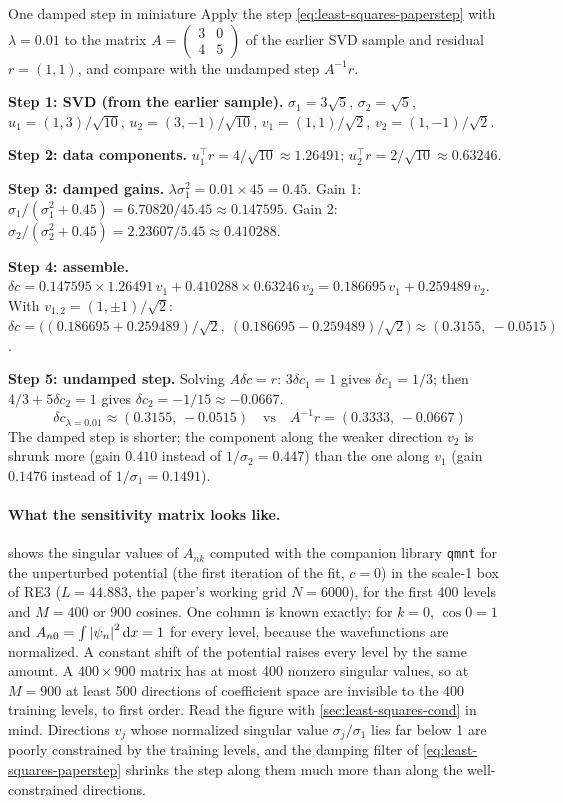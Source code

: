 \begin{sample}{One damped step in miniature}
Apply the step \cref{eq:least-squares-paperstep} with $\lambda = 0.01$ to the matrix $A = \begin{pmatrix}3&0\\4&5\end{pmatrix}$ of the earlier SVD sample and residual $r = (1,1)$, and compare with the undamped step $A^{-1}r$.

\textbf{Step 1: SVD (from the earlier sample).} $\sigma_1 = 3\sqrt5$, $\sigma_2 = \sqrt5$, $u_1 = (1,3)/\sqrt{10}$, $u_2 = (3,-1)/\sqrt{10}$, $v_1 = (1,1)/\sqrt2$, $v_2 = (1,-1)/\sqrt2$.

\textbf{Step 2: data components.} $u_1^\top r = 4/\sqrt{10}\approx1.26491$; $u_2^\top r = 2/\sqrt{10}\approx0.63246$.

\textbf{Step 3: damped gains.} $\lambda\sigma_1^2 = 0.01\times45 = 0.45$. Gain 1: $\sigma_1/(\sigma_1^2+0.45) = 6.70820/45.45\approx0.147595$. Gain 2: $\sigma_2/(\sigma_2^2+0.45) = 2.23607/5.45\approx0.410288$.

\textbf{Step 4: assemble.} $\delta c = 0.147595\times1.26491\,v_1 + 0.410288\times0.63246\,v_2 = 0.186695\,v_1 + 0.259489\,v_2$. With $v_{1,2} = (1,\pm1)/\sqrt2$: $\delta c = \bigl((0.186695+0.259489)/\sqrt2,\ (0.186695-0.259489)/\sqrt2\bigr)\approx(0.3155,\ -0.0515)$.

\textbf{Step 5: undamped step.} Solving $A\delta c = r$: $3\delta c_1 = 1$ gives $\delta c_1 = 1/3$; then $4/3 + 5\delta c_2 = 1$ gives $\delta c_2 = -1/15\approx-0.0667$.
\[
\boxed{\,\delta c_{\lambda=0.01}\approx(0.3155,\,-0.0515)\quad\text{vs}\quad A^{-1}r = (0.3333,\,-0.0667)\,}
\]
The damped step is shorter; the component along the weaker direction $v_2$ is shrunk more (gain $0.410$ instead of $1/\sigma_2 = 0.447$) than the one along $v_1$ (gain $0.1476$ instead of $1/\sigma_1 = 0.1491$).
\end{sample}

\paragraph{What the sensitivity matrix looks like.}  shows the singular values of $A_{nk}$ computed with the companion library \texttt{qmnt} for the unperturbed potential (the first iteration of the fit, $c=0$) in the scale-1 box of RE3 ($L = 44.883$, the paper's working grid $N=6000$), for the first 400 levels and $M = 400$ or $900$ cosines. One column is known exactly: for $k=0$, $\cos0 = 1$ and $A_{n0} = \int\left\lvert \psi_n\right\rvert^2\mathrm{d} x = 1$ for every level, because the wavefunctions are normalized. A constant shift of the potential raises every level by the same amount. A $400\times900$ matrix has at most 400 nonzero singular values, so at $M = 900$ at least 500 directions of coefficient space are invisible to the 400 training levels, to first order. Read the figure with \cref{sec:least-squares-cond} in mind. Directions $v_j$ whose normalized singular value $\sigma_j/\sigma_1$ lies far below 1 are poorly constrained by the training levels, and the damping filter of \cref{eq:least-squares-paperstep} shrinks the step along them much more than along the well-constrained directions.

